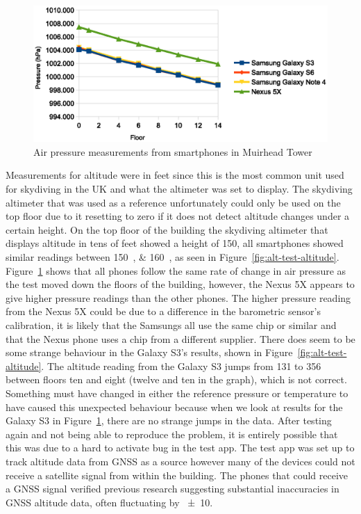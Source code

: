 \documentclass[11pt, a4paper, twocolumn]{article}
\begin{document}
\begin{figure}[h]
    \centering
    \includegraphics{alt-test-pressure}
    \caption{Air pressure measurements from smartphones in Muirhead Tower}\label{fig:alt-test-pressure}
\end{figure}

Measurements for altitude were in feet since this is the most common unit used for skydiving in the UK and what the altimeter was set to display. The skydiving altimeter that was used as a reference unfortunately could only be used on the top floor due to it resetting to zero if it does not detect altitude changes under a certain height. On the top floor of the building the skydiving altimeter that displays altitude in tens of feet showed a height of \SI{150}{\feet}, all smartphones showed similar readings between \SIlist{150; 160}{\feet}, as seen in Figure~\ref{fig:alt-test-altitude}.
Figure~\ref{fig:alt-test-pressure} shows that all phones follow the same rate of change in air pressure as the test moved down the floors of the building, however, the Nexus 5X appears to give higher pressure readings than the other phones. The higher pressure reading from the Nexus 5X could be due to a difference in the barometric sensor's calibration, it is likely that the Samsungs all use the same chip or similar and that the Nexus phone uses a chip from a different supplier.
There does seem to be some strange behaviour in the Galaxy S3's results, shown in Figure~\ref{fig:alt-test-altitude}. The altitude reading from the Galaxy S3 jumps from \SI{131}{\feet} to \SI{356}{\feet} between floors ten and eight (twelve and ten in the graph), which is not correct. Something must have changed in either the reference pressure or temperature to have caused this unexpected behaviour because when we look at results for the Galaxy S3 in Figure~\ref{fig:alt-test-pressure}, there are no strange jumps in the data. After testing again and not being able to reproduce the problem, it is entirely possible that this was due to a hard to activate bug in the test app. The test app was set up to track altitude data from GNSS as a source however many of the devices could not receive a satellite signal from within the building. The phones that could receive a GNSS signal verified previous research suggesting substantial inaccuracies in GNSS altitude data, often fluctuating by \SI{\pm10}{\feet}.
\end{document}
